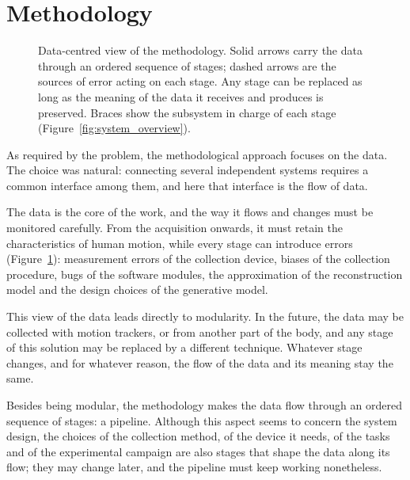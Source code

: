 \documentclass[12pt]{report}
\begin{document}
\section{Methodology}
\begin{figure}[htbp]
    \centering
    \resizebox{\linewidth}{!}{%
    
    }
    \caption{Data-centred view of the methodology. Solid arrows carry the data through an ordered sequence of stages; dashed arrows are the sources of error acting on each stage. Any stage can be replaced as long as the meaning of the data it receives and produces is preserved. Braces show the subsystem in charge of each stage (Figure~\ref{fig:system_overview}).}
    \label{fig:methodology_dataflow}
\end{figure}
As required by the problem, the methodological approach focuses on the data. The choice was natural: connecting several independent systems requires a common interface among them, and here that interface is the flow of data.

The data is the core of the work, and the way it flows and changes must be monitored carefully. From the acquisition onwards, it must retain the characteristics of human motion, while every stage can introduce errors (Figure~\ref{fig:methodology_dataflow}): measurement errors of the collection device, biases of the collection procedure, bugs of the software modules, the approximation of the reconstruction model and the design choices of the generative model.

This view of the data leads directly to modularity. In the future, the data may be collected with motion trackers, or from another part of the body, and any stage of this solution may be replaced by a different technique. Whatever stage changes, and for whatever reason, the flow of the data and its meaning stay the same.

Besides being modular, the methodology makes the data flow through an ordered sequence of stages: a pipeline. Although this aspect seems to concern the system design, the choices of the collection method, of the device it needs, of the tasks and of the experimental campaign are also stages that shape the data along its flow; they may change later, and the pipeline must keep working nonetheless.
\end{document}
